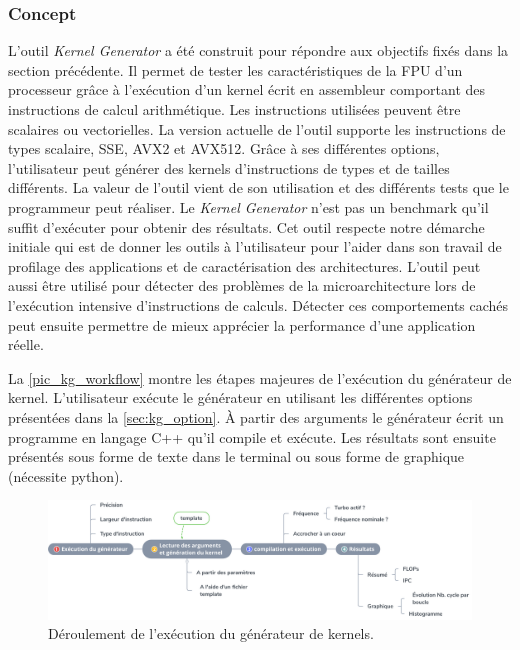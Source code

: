         

    \subsubsection{Concept}

            L'outil \textit{Kernel Generator} a été construit pour répondre aux objectifs fixés dans la section précédente. Il permet de tester les caractéristiques de la FPU d'un processeur grâce à l'exécution d'un kernel écrit en assembleur comportant des instructions de calcul arithmétique. Les instructions utilisées peuvent être scalaires ou vectorielles. La version actuelle de l'outil supporte les instructions de types scalaire, SSE, AVX2 et AVX512. 
            Grâce à ses différentes options, l'utilisateur peut générer des kernels d'instructions de types et de tailles différents. La valeur de l'outil vient de son utilisation et des différents tests que le programmeur peut réaliser. Le \textit{Kernel Generator} n'est pas un benchmark qu'il suffit d'exécuter pour obtenir des résultats. Cet outil respecte notre démarche initiale qui est de donner les outils à l'utilisateur pour l'aider dans son travail de profilage des applications et de caractérisation des architectures. 
            L'outil peut aussi être utilisé pour détecter des problèmes de la microarchitecture lors de l'exécution intensive d'instructions de calculs. Détecter ces comportements cachés peut ensuite permettre de mieux apprécier la performance d'une application réelle. 
        
     
        
            La \autoref{pic_kg_workflow} montre les étapes majeures de l'exécution du générateur de kernel. L'utilisateur exécute le générateur en utilisant les différentes options présentées dans la \autoref{sec:kg_option}. À partir des arguments le générateur écrit un programme en langage C++ qu'il compile et exécute. Les résultats sont ensuite présentés sous forme de texte dans le terminal ou sous forme de graphique (nécessite python). 
        
    
            \begin{figure}
            \center
            \includegraphics[width=16cm]{images/kg_workflow.png}
            \caption{\label{pic_kg_workflow} Déroulement de l'exécution du générateur de kernels.}
            \end{figure}
    
